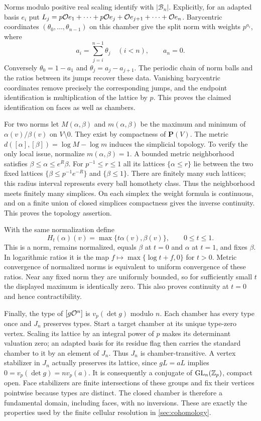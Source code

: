Norms modulo positive real scaling identify with $|\mathcal B_n|$.
Explicitly, for an adapted basis $e_i$ put
$L_j=p\mathcal O e_1+\cdots+p\mathcal O e_j+\mathcal O e_{j+1}+\cdots+\mathcal O e_n$.
Barycentric coordinates $(\theta_0,\ldots,\theta_{n-1})$ on this chamber
give the split norm with weights $p^{a_i}$, where
\[
 a_i=\sum_{j=i}^{n-1}\theta_j\quad(i<n),\qquad a_n=0.
\]
Conversely $\theta_0=1-a_1$ and $\theta_j=a_j-a_{j+1}$.
The periodic chain of norm balls and the ratios between its jumps recover
these data.  Vanishing barycentric coordinates remove precisely the
corresponding jumps, and the endpoint identification is multiplication
of the lattice by $p$.  This proves the claimed identification on faces
as well as chambers.

For two norms let $M(\alpha,\beta)$ and $m(\alpha,\beta)$ be the
maximum and minimum of $\alpha(v)/\beta(v)$ on $V\setminus0$.
They exist by compactness of $\mathbf P(V)$.  The metric
$d([\alpha],[\beta])=\log M-\log m$ induces the simplicial topology.
To verify the only local issue, normalize $m(\alpha,\beta)=1$.
A bounded metric neighborhood satisfies
$\beta\le\alpha\le e^R\beta$.  For $p^{-1}\le r\le1$ all its
lattices $\{\alpha\le r\}$ lie between the two fixed lattices
$\{\beta\le p^{-1}e^{-R}\}$ and $\{\beta\le1\}$.
There are finitely many such lattices; this radius interval represents
every ball homothety class.  Thus the neighborhood meets finitely many
simplices.  On each simplex the weight formula is continuous, and on
a finite union of closed simplices compactness gives the inverse
continuity.  This proves the topology assertion.

With the same normalization define
\[
 H_t(\alpha)(v)=\max\{t\alpha(v),\beta(v)\},\qquad 0\le t\le1.
\]
This is a norm, remains normalized, equals $\beta$ at $t=0$ and
$\alpha$ at $t=1$, and fixes $\beta$.  In logarithmic ratios it is the
map $f\mapsto\max\{\log t+f,0\}$ for $t>0$.
Metric convergence of normalized norms is equivalent to uniform
convergence of these ratios.  Near any fixed norm they are uniformly
bounded, so for sufficiently small $t$ the displayed maximum is
identically zero.  This also proves continuity at $t=0$ and hence
contractibility.

Finally, the type of $[g\mathcal O^n]$ is $v_p(\det g)$ modulo $n$.
Each chamber has every type once and $J_n$ preserves types.
Start a target chamber at its unique type-zero vertex.  Scaling its
lattice by an integral power of $p$ makes its determinant valuation zero;
an adapted basis for its residue flag then carries the standard chamber
to it by an element of $J_n$.  Thus $J_n$ is chamber-transitive.
A vertex stabilizer in $J_n$ actually preserves its lattice, since
$gL=aL$ implies $0=v_p(\det g)=n v_p(a)$.  It is consequently a
conjugate of $\operatorname{GL}_n(\mathbb Z_p)$, compact open.  Face stabilizers are finite
intersections of these groups and fix their vertices pointwise because
types are distinct.  The closed chamber is therefore a fundamental
domain, including faces, with no inversions.  These are exactly the
properties used by the finite cellular resolution in \cref{sec:cohomology}.
